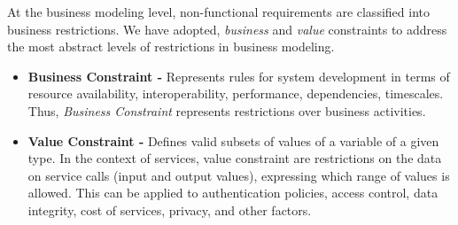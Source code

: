 At the business modeling level, non-functional requirements are classified
into business restrictions. We have adopted, \textit{business} and \textit{value}
constraints to address the most abstract levels of restrictions in business
modeling. 






\begin{itemize}
  \item \textbf{Business Constraint -} Represents rules for system
  development in terms of resource availability, interoperability, performance,
  dependencies, timescales.  Thus, \textit{Business Constraint}
  represents restrictions over business activities.
  \item \textbf{Value Constraint -} Defines valid subsets of values of a
  variable of a given type. In the context of services, value constraint are
  restrictions on the data on service calls (input and output values),
  expressing which range of values is allowed. This can be applied to
  authentication policies, access control, data integrity, cost of services, privacy, and other factors. 
\end{itemize}  

% 
%  
  
